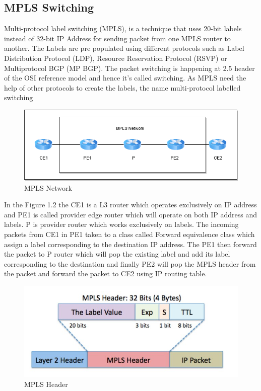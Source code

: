\subsection{MPLS Switching} 

Multi-protocol label switching (MPLS)\cite{farrel_2004}, is a technique that uses 20-bit labels instead of 32-bit IP Address for sending packet from one MPLS router to another. The Labels are pre populated using different protocols such as Label Distribution Protocol (LDP), Resource Reservation Protocol (RSVP) or Multiprotocol BGP (MP BGP). The packet switching is happening at 2.5 header of the OSI reference model and hence it's called switching. As MPLS need the help of other protocols to create the labels, the name multi-protocol labelled switching  

 \begin{figure}
       \centering\includegraphics[width=\textwidth]{Final/MPLS Network.png}
       \caption{MPLS Network}
       \label{fig:compbest}
\end{figure}

In the Figure 1.2 the CE1 is a L3 router which operates exclusively on IP address and PE1 is called provider edge router which will operate on both IP address and labels. P is provider router which works exclusively on labels. The incoming packets from CE1 in PE1 taken to a class called Forward equivalence class which assign a label corresponding to the destination IP address. The PE1 then forward the packet to P router which will pop the existing label and add its label corresponding to the destination and finally PE2 will pop the MPLS header from the packet and forward the packet to CE2 using IP routing table. 



 

 \begin{figure}
       \centering\includegraphics[width=\textwidth]{Final/MPLS Header.jpg}
       \caption{MPLS Header}
       \label{fig:compbest}
\end{figure}


